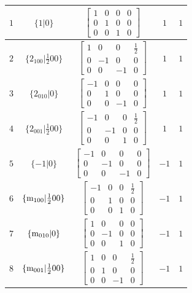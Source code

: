 \documentclass[fleqn,8pt]{jsarticle}
\begin{document}
\begin{longtable}{ccccc}
$ 1 $ & $ \{1|0\} $ & $ \begin{bmatrix} 1 & 0 & 0 & 0 \\ 0 & 1 & 0 & 0 \\ 0 & 0 & 1 & 0 \end{bmatrix} $ & $ 1 $ & $ 1 $ \\ \hline
$ 2 $ & $ \{2{}_{100}|\frac{1}{2} 0 0\} $ & $ \begin{bmatrix} 1 & 0 & 0 & \frac{1}{2} \\ 0 & -1 & 0 & 0 \\ 0 & 0 & -1 & 0 \end{bmatrix} $ & $ 1 $ & $ 1 $ \\ \hline
$ 3 $ & $ \{2{}_{010}|0\} $ & $ \begin{bmatrix} -1 & 0 & 0 & 0 \\ 0 & 1 & 0 & 0 \\ 0 & 0 & -1 & 0 \end{bmatrix} $ & $ 1 $ & $ 1 $ \\ \hline
$ 4 $ & $ \{2{}_{001}|\frac{1}{2} 0 0\} $ & $ \begin{bmatrix} -1 & 0 & 0 & \frac{1}{2} \\ 0 & -1 & 0 & 0 \\ 0 & 0 & 1 & 0 \end{bmatrix} $ & $ 1 $ & $ 1 $ \\ \hline
$ 5 $ & $ \{-1|0\} $ & $ \begin{bmatrix} -1 & 0 & 0 & 0 \\ 0 & -1 & 0 & 0 \\ 0 & 0 & -1 & 0 \end{bmatrix} $ & $ -1 $ & $ 1 $ \\ \hline
$ 6 $ & $ \{{\rm m}_{100}|\frac{1}{2} 0 0\} $ & $ \begin{bmatrix} -1 & 0 & 0 & \frac{1}{2} \\ 0 & 1 & 0 & 0 \\ 0 & 0 & 1 & 0 \end{bmatrix} $ & $ -1 $ & $ 1 $ \\ \hline
$ 7 $ & $ \{{\rm m}_{010}|0\} $ & $ \begin{bmatrix} 1 & 0 & 0 & 0 \\ 0 & -1 & 0 & 0 \\ 0 & 0 & 1 & 0 \end{bmatrix} $ & $ -1 $ & $ 1 $ \\ \hline
$ 8 $ & $ \{{\rm m}_{001}|\frac{1}{2} 0 0\} $ & $ \begin{bmatrix} 1 & 0 & 0 & \frac{1}{2} \\ 0 & 1 & 0 & 0 \\ 0 & 0 & -1 & 0 \end{bmatrix} $ & $ -1 $ & $ 1 $ \\ \hline

\end{longtable}
\end{document}
